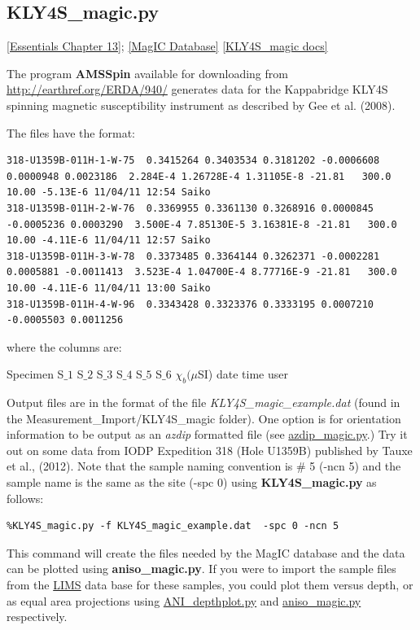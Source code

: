 \documentclass[11pt]{book}
\begin{document}
{{%


\subsection{KLY4S\_magic.py}  \href{http://earthref.org/MAGIC/books/Tauxe/Essentials/WebBook3ch13.html#ch13}{[Essentials Chapter 13]};
\href{#MagICDatabase}{[MagIC Database]}
\href{https://github.com/PmagPy/PmagPy/blob/master/programs/KLY4S_magic.py}{[KLY4S\_magic docs]}

The program {\bf AMSSpin} available for downloading from \url{http://earthref.org/ERDA/940/}  generates data for the Kappabridge KLY4S spinning magnetic susceptibility instrument as described by Gee et al. (2008).  \nocite{gee08}

The files have the format:
\begin{verbatim}
318-U1359B-011H-1-W-75  0.3415264 0.3403534 0.3181202 -0.0006608 0.0000948 0.0023186  2.284E-4 1.26728E-4 1.31105E-8 -21.81   300.0   10.00 -5.13E-6 11/04/11 12:54 Saiko
318-U1359B-011H-2-W-76  0.3369955 0.3361130 0.3268916 0.0000845 -0.0005236 0.0003290  3.500E-4 7.85130E-5 3.16381E-8 -21.81   300.0   10.00 -4.11E-6 11/04/11 12:57 Saiko
318-U1359B-011H-3-W-78  0.3373485 0.3364144 0.3262371 -0.0002281 0.0005881 -0.0011413  3.523E-4 1.04700E-4 8.77716E-9 -21.81   300.0   10.00 -4.11E-6 11/04/11 13:00 Saiko
318-U1359B-011H-4-W-96  0.3343428 0.3323376 0.3333195 0.0007210 -0.0005503 0.0011256
 \end{verbatim}
 where the columns are:

 Specimen S$\_1$  S$\_2$ S$\_3$  S$\_4$ S$\_5$ S$\_6$ $\chi_b (\mu$SI) date time user


Output files are in the format of the file {\it KLY4S\_magic\_example.dat} (found in the Measurement\_Import/KLY4S\_magic folder).  One option is for orientation information to be output as an {\it azdip} formatted file (see \href{#azdip_magic.py}{azdip\_magic.py}.)
Try it out on some data from IODP Expedition 318 (Hole U1359B) published by Tauxe et al., (2012).  Note that the sample naming convention is \# 5 (-ncn 5)  and the sample name is the same as the site (-spc 0) \nocite{tauxe12} using  {\bf KLY4S\_magic.py} as follows:

\begin{verbatim}
%KLY4S_magic.py -f KLY4S_magic_example.dat  -spc 0 -ncn 5
\end{verbatim}

This command will create the files needed by the MagIC database and the data can be plotted using {\bf aniso\_magic.py}.    If you were to import the sample files from the \href{#LIMS}{LIMS} data base for these samples, you could plot them versus depth, or as equal area projections using \href{#ANI_depthplot.py}{ANI\_depthplot.py} and \href{#aniso_magic.py}{aniso\_magic.py} respectively.





}}
\end{document}
